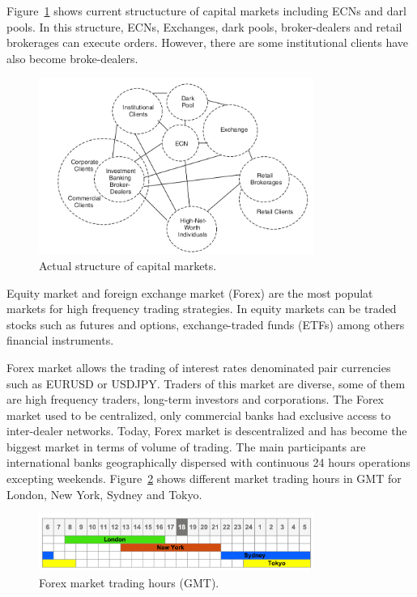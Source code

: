 Figure~\ref{fig:capitalmarketnow} shows current structucture of capital markets
including ECNs and darl pools. In this structure, ECNs, Exchanges, dark pools,
broker-dealers and retail brokerages can execute orders. However, there are some
institutional clients have also become broke-dealers.

\begin{figure}[!h]
  \centering
  \includegraphics[width=0.8\textwidth]{img/capitalmarketsnow}
  \caption{Actual structure of capital markets.}
  \label{fig:capitalmarketnow}
\end{figure}



Equity market and foreign exchange market (Forex) are the most populat markets
for high frequency trading strategies. In equity markets can be traded stocks
such as futures and options, exchange-traded funds (ETFs) among others financial
instruments.

Forex market allows the trading of interest rates denominated pair currencies
such as EURUSD or USDJPY. Traders of this market are diverse, some of them are
high frequency traders, long-term investors and corporations. The Forex market
used to be centralized, only commercial banks had exclusive access to
inter-dealer networks. Today, Forex market is descentralized and has become the
biggest market in terms of volume of trading. The main participants are
international banks geographically dispersed with continuous 24 hours operations
excepting weekends. Figure~\ref{fig:Forextimes} shows different market trading
hours in GMT for London, New York, Sydney and Tokyo.

\begin{figure}[!h]
  \centering
  \includegraphics[width=0.8\textwidth]{img/forex-trading-hours}
  \caption{Forex market trading hours (GMT).}
  \label{fig:Forextimes}
\end{figure}


